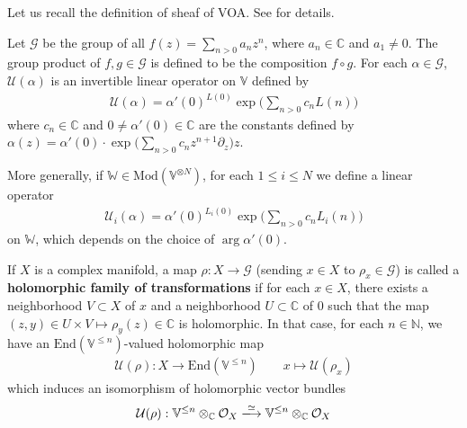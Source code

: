 \documentclass[11pt,b5paper,notitlepage]{article}
\theoremstyle{definition}
\theoremstyle{plain}
\newcommand{\End}{\mathrm{End}} %
\newcommand{\Vbb}{\mathbb V}
\newcommand{\Wbb}{\mathbb W}
\newcommand{\Cbb}{\mathbb C}
\newcommand{\Nbb}{\mathbb N}
\newcommand{\<}{\left\langle}
\renewcommand{\>}{\right\rangle}
\newcommand{\MO}{\mathcal{O}}
\newcommand{\MU}{\mathcal{U}}
\newcommand{\MG}{\mathcal G}
\newcommand{\Mod}{\mathrm{Mod}}
\numberwithin{equation}{section}
\begin{document}
Let us recall the definition of sheaf of VOA. See \cite[Subsec. 1.3.1]{GZ2} for details.

Let $\mathcal G$ be the group of all $f(z)=\sum_{n>0}a_n z^n$, where $a_n\in \Cbb$ and $a_1\ne 0$. The group product of $f,g\in\MG$ is defined to be the composition $f\circ g$. For each $\alpha\in\MG$, $\MU(\alpha)$ is an invertible linear operator on $\Vbb$ defined by
	 \begin{align*}
\MU(\alpha)=\alpha'(0)^{L(0)}\exp\Big(\sum_{n>0}c_n L(n)\Big)
	 \end{align*}
where $c_n\in\Cbb$ and $0\neq\alpha'(0)\in\Cbb$ are the constants defined by $\alpha(z)=\alpha'(0)\cdot \exp\big(\sum_{n>0}c_n z^{n+1}\partial_z\big)z$.


More generally, if $\Wbb\in\Mod(\Vbb^{\otimes N})$, for each $1\leq i\leq N$ we define a linear operator
\begin{align}\label{eq93}
\MU_i(\alpha)=\alpha'(0)^{L_i(0)}\exp\Big(\sum_{n>0}c_n L_i(n)\Big)
\end{align}
on $\Wbb$, which depends on the choice of $\arg\alpha'(0)$.


If $X$ is a complex manifold, a map $\rho:X\rightarrow\MG$ (sending $x\in X$ to $\rho_x\in\MG$) is called a \textbf{holomorphic family of transformations} if for each $x\in X$, there exists a neighborhood $V\subset X$ of $x$ and a neighborhood $U\subset \Cbb$ of $0$ such that the map $(z,y)\in U\times V\mapsto\rho_y(z)\in\Cbb$ is holomorphic. In that case, for each $n\in\Nbb$, we have an $\End(\Vbb^{\leq n})$-valued holomorphic map
\begin{align*}
\MU(\rho):X\rightarrow \End(\Vbb^{\leq n})\qquad x\mapsto\MU(\rho_x)
\end{align*}
which induces an isomorphism of holomorphic vector bundles
\begin{align*}
\MU(\rho):\Vbb^{\leq n}\otimes_\Cbb\MO_X\xlongrightarrow{\simeq}\Vbb^{\leq n}\otimes_\Cbb\MO_X
\end{align*}
\end{document}
